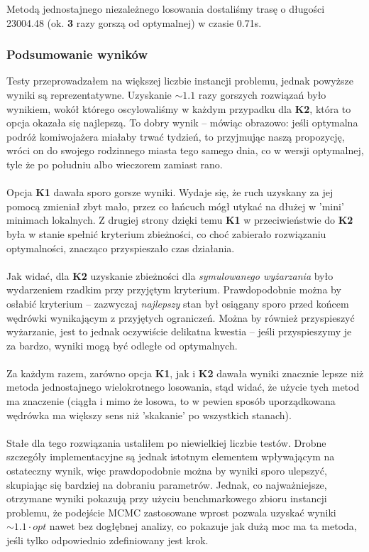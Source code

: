 \documentclass[a4paper]{article}
\theoremstyle{defn}
\theoremstyle{theorem}
\theoremstyle{lemma}
\theoremstyle{cor}
\theoremstyle{fact}
\begin{document}
Metodą jednostajnego niezależnego losowania dostaliśmy trasę o długości 23004.48 (ok. \textbf{3} razy gorszą od optymalnej) w czasie 0.71s.

\subsubsection{Podsumowanie wyników}
Testy przeprowadzałem na większej liczbie instancji problemu, jednak powyższe wyniki są reprezentatywne. Uzyskanie $\sim 1.1$ razy gorszych rozwiązań było wynikiem, wokół którego oscylowaliśmy w każdym przypadku dla \textbf{K2}, która to opcja okazała się najlepszą. To dobry wynik – mówiąc obrazowo: jeśli optymalna podróż komiwojażera miałaby trwać tydzień, to przyjmując naszą propozycję, wróci on do swojego rodzinnego miasta tego samego dnia, co w wersji optymalnej, tyle że po południu albo wieczorem zamiast rano.\\\\
Opcja \textbf{K1} dawała sporo gorsze wyniki. Wydaje się, że ruch uzyskany za jej pomocą zmieniał zbyt mało, przez co łańcuch mógł utykać na dłużej w 'mini' minimach lokalnych. Z drugiej strony dzięki temu \textbf{K1} w przeciwieństwie do \textbf{K2} była w stanie spełnić kryterium zbieżności, co choć zabierało rozwiązaniu optymalności, znacząco przyspieszało czas działania.\\\\
Jak widać, dla \textbf{K2} uzyskanie zbieżności dla \textit{symulowanego wyżarzania} było wydarzeniem rzadkim przy przyjętym kryterium. Prawdopodobnie można by osłabić kryterium – zazwyczaj \textit{najlepszy} stan był osiągany sporo przed końcem wędrówki wynikającym z przyjętych ograniczeń. Można by również przyspieszyć wyżarzanie, jest to jednak oczywiście delikatna kwestia – jeśli przyspieszymy je za bardzo, wyniki mogą być odległe od optymalnych.\\\\
Za każdym razem, zarówno opcja \textbf{K1}, jak i \textbf{K2} dawała wyniki znacznie lepsze niż metoda jednostajnego wielokrotnego losowania, stąd widać, że użycie tych metod ma znaczenie (ciągła i mimo że losowa, to w pewien sposób uporządkowana wędrówka ma większy sens niż 'skakanie' po wszystkich stanach).\\\\
Stałe dla tego rozwiązania ustaliłem po niewielkiej liczbie testów. Drobne szczegóły implementacyjne są jednak istotnym elementem wpływającym na ostateczny wynik, więc prawdopodobnie można by wyniki sporo ulepszyć, skupiając się bardziej na dobraniu parametrów. Jednak, co najważniejsze, otrzymane wyniki pokazują przy użyciu benchmarkowego zbioru instancji problemu, że podejście MCMC zastosowane wprost pozwala uzyskać wyniki $\sim 1.1 \cdot opt$ nawet bez dogłębnej analizy, co pokazuje jak dużą moc ma ta metoda, jeśli tylko odpowiednio zdefiniowany jest krok.
\end{document}
